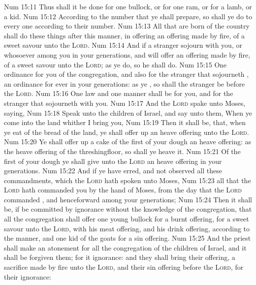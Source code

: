 \vs Num 15:11 Thus shall it be done for one bullock, or for one ram, or for a lamb, or a kid.
\vs Num 15:12 According to the number that ye shall prepare, so shall ye do to every one according to their number.
\vs Num 15:13 All that are born of the country shall do these things after this manner, in offering an offering made by fire, of a sweet savour unto the \textsc{Lord}.
\vs Num 15:14 And if a stranger sojourn with you, or whosoever  among you in your generations, and will offer an offering made by fire, of a sweet savour unto the \textsc{Lord}; as ye do, so he shall do.
\vs Num 15:15 One ordinance  for you of the congregation, and also for the stranger that sojourneth , an ordinance for ever in your generations: as ye , so shall the stranger be before the \textsc{Lord}.
\vs Num 15:16 One law and one manner shall be for you, and for the stranger that sojourneth with you.
\vs Num 15:17 And the \textsc{Lord} spake unto Moses, saying,
\vs Num 15:18 Speak unto the children of Israel, and say unto them, When ye come into the land whither I bring you,
\vs Num 15:19 Then it shall be, that, when ye eat of the bread of the land, ye shall offer up an heave offering unto the \textsc{Lord}.
\vs Num 15:20 Ye shall offer up a cake of the first of your dough  an heave offering: as  the heave offering of the threshingfloor, so shall ye heave it.
\vs Num 15:21 Of the first of your dough ye shall give unto the \textsc{Lord} an heave offering in your generations.
\vs Num 15:22 And if ye have erred, and not observed all these commandments, which the \textsc{Lord} hath spoken unto Moses,
\vs Num 15:23  all that the \textsc{Lord} hath commanded you by the hand of Moses, from the day that the \textsc{Lord} commanded , and henceforward among your generations;
\vs Num 15:24 Then it shall be, if  be committed by ignorance without the knowledge of the congregation, that all the congregation shall offer one young bullock for a burnt offering, for a sweet savour unto the \textsc{Lord}, with his meat offering, and his drink offering, according to the manner, and one kid of the goats for a sin offering.
\vs Num 15:25 And the priest shall make an atonement for all the congregation of the children of Israel, and it shall be forgiven them; for it  ignorance: and they shall bring their offering, a sacrifice made by fire unto the \textsc{Lord}, and their sin offering before the \textsc{Lord}, for their ignorance:
